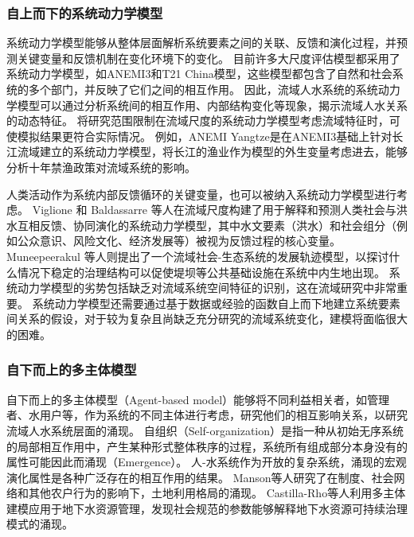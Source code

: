 \subsubsection*{自上而下的系统动力学模型}

系统动力学模型能够从整体层面解析系统要素之间的关联、反馈和演化过程\cite{jaeger2017}，并预测关键变量和反馈机制在变化环境下的变化\cite{vaighan2017}。
目前许多大尺度评估模型都采用了系统动力学模型，如ANEMI3和T21 China模型，这些模型都包含了自然和社会系统的多个部门，并反映了它们之间的相互作用\cite{breach2021, qu2020}。
因此，流域人水系统的系统动力学模型可以通过分析系统间的相互作用、内部结构变化等现象，揭示流域人水关系的动态特征。
将研究范围限制在流域尺度的系统动力学模型考虑流域特征时，可使模拟结果更符合实际情况。
例如，ANEMI Yangtze是在ANEMI3基础上针对长江流域建立的系统动力学模型\cite{jiang2022}，将长江的渔业作为模型的外生变量考虑进去，能够分析十年禁渔政策对流域系统的影响\cite{jiang2022}。

人类活动作为系统内部反馈循环的关键变量，也可以被纳入系统动力学模型进行考虑。
Viglione 和 Baldassarre 等人在流域尺度构建了用于解释和预测人类社会与洪水互相反馈、协同演化的系统动力学模型\cite{viglione2014,dibaldassarre2015}，其中水文要素（洪水）和社会组分（例如公众意识、风险文化、经济发展等）被视为反馈过程的核心变量\cite{song2021a,ciullo2017}。
Muneepeerakul 等人则提出了一个流域社会-生态系统的发展轨迹模型，以探讨什么情况下稳定的治理结构可以促使堤坝等公共基础设施在系统中内生地出现\cite{muneepeerakul2017}。
系统动力学模型的劣势包括缺乏对流域系统空间特征的识别，这在流域研究中非常重要。
系统动力学模型还需要通过基于数据或经验的函数自上而下地建立系统要素间关系的假设，对于较为复杂且尚缺乏充分研究的流域系统变化，建模将面临很大的困难。

\subsubsection*{自下而上的多主体模型}

自下而上的多主体模型（Agent-based model）能够将不同利益相关者，如管理者、水用户等，作为系统的不同主体进行考虑，研究他们的相互影响关系，以研究流域人水系统层面的涌现\cite{biggs2021}。
自组织（Self-organization）是指一种从初始无序系统的局部相互作用中，产生某种形式整体秩序的过程\cite{berkes2008}，系统所有组成部分本身没有的属性可能因此而涌现（Emergence）。
人-水系统作为开放的复杂系统，涌现的宏观演化属性是各种广泛存在的相互作用的结果\cite{schluter2019}。
Manson等人研究了在制度、社会网络和其他农户行为的影响下，土地利用格局的涌现\cite{manson2016}。
Castilla-Rho等人利用多主体建模应用于地下水资源管理，发现社会规范的参数能够解释地下水资源可持续治理模式的涌现\cite{castilla-rho2017a,castilla-rho2015,castilla-rho2019,castilla-rho2017}。

